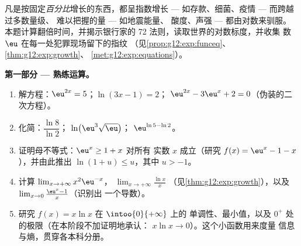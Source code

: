 \begin{problem}
\label{pb:g12:exp:1}
凡是按固定\emph{百分比}增长的东西，都呈指数增长
--- 如存款、细菌、疫情 --- 而跨越过多数量级、
难以把握的量 --- 如地震能量、
酸度、声强 --- 都由对数来驯服。
本题计算翻倍时间，并揭示银行家的
72 法则，读取世界的对数标度，并收集
数 $\eu$ 在每一处犯罪现场留下的指纹
（见\cref{prop:g12:exp:funceq}、\cref{thm:g12:exp:growth}、
\cref{met:g12:exp:equations}）。

\medskip
\noindent\textbf{第一部分 --- 熟练运算。}
\begin{enumerate}
  \item 解方程：$\eu^{2x} = 5$；\quad $\ln(3x - 1) = 2$；\quad
        $\eu^{2x} - 3\eu^x + 2 = 0$（伪装的二次方程）。
  \item 化简：$\dfrac{\ln 8}{\ln 2}$；\quad
        $\ln\!\left(\eu^3 \sqrt{\eu}\right)$；\quad
        $\eu^{\ln 5 - \ln 2}$。
  \item 证明母不等式：$\eu^x \geq 1 + x$ 对所有
        实数 $x$ 成立（研究 $f(x) = \eu^x - 1 - x$），并由此推出
        $\ln(1 + u) \leq u$，其中 $u > -1$。
  \item 计算
        $\lim_{x \to +\infty} x^2 \eu^{-x}$，
        $\lim_{x \to +\infty} \frac{\ln x}{x}$
        （见\cref{thm:g12:exp:growth}），以及
        $\lim_{x \to 0} \frac{\eu^x - 1}{x}$（识别出
        一个导数）。
  \item 研究 $f(x) = x \ln x$ 在 $\intoo{0}{+\infty}$ 上的
        单调性、最小值，以及 $0^+$ 处的极限（在本阶段不加证明地承认：
        $x \ln x \to 0$）。这个小函数用来度量
        信息与熵，贯穿各本科分册。
\end{enumerate}


\end{problem}
